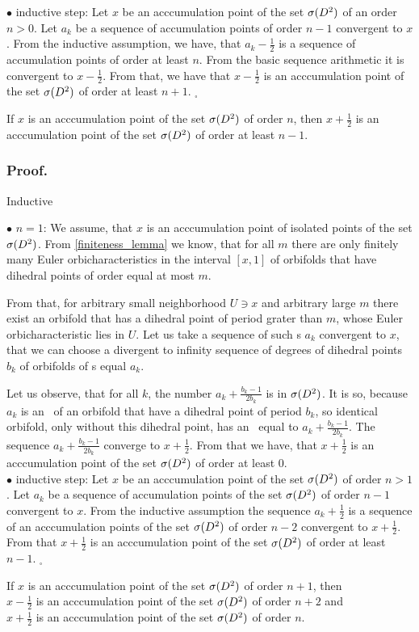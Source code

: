 $\bullet$ inductive step: Let $x$ be an acccumulation point of the set ${{\sigma}(D^2)}$ of an order 
$n > 0$. 
Let $a_k$ be a sequence of accumulation points of order $n-1$ convergent to $x$. From the 
inductive assumption, we have, that $a_k - \frac{1}{2}$ is a sequence of accumulation points 
of order at least $n$. From the basic sequence arithmetic it is convergent to $x-\frac{1}{2}$. 
From that, we have that $x-\frac{1}{2}$ is an acccumulation point of the set ${{\sigma}(D^2)}$ of order 
at least $n+1$. $_\square$
\begin{lemma}\label{second_order_lemma}
If $x$ is an acccumulation point of the set ${{\sigma}(D^2)}$ of order $n$, then $x+\frac{1}{2}$ is 
an acccumulation point of the set ${{\sigma}(D^2)}$ of order at least $n-1$.  
\end{lemma}
\subsubsection{Proof.}  
Inductive 

$\bullet$ $n = 1$: We assume, that $x$ is an acccumulation point of isolated points of the set 
${{\sigma}(D^2)}$. 
From \ref{finiteness_lemma} we know, that for all $m$ there are only finitely many 
Euler orbicharacteristics 
in the interval $[x,1]$ of orbifolds that have dihedral points of order equal at most $m$. 

From that, for arbitrary small neighborhood $U \ni x$ and arbitrary large $m$ there exist 
an orbifold 
that has a dihedral point of period grater than $m$, whose Euler orbicharacteristic lies in $U$. 
Let us take a sequence of such \Eoc s $a_k$ convergent to $x$, that we can choose 
a divergent to infinity sequence of degrees of dihedral points $b_k$ of orbifolds of \Eoc s 
equal $a_k$. 

Let us observe, that for all $k$, the number $a_k+\frac{b_k-1}{2b_k}$ is in ${{\sigma}(D^2)}$. 
It is so, because $a_k$ is an \Eoc\ of an orbifold that have a dihedral point of period $b_k$, so 
identical orbifold, only without this dihedral point, has an \Eoc\ equal to $a_k + 
\frac{b_k-1}{2b_k}$. 
The sequence $a_k + \frac{b_k-1}{2b_k}$ converge to $x+\frac{1}{2}$. From that we have, that 
$x + \frac{1}{2}$ is an acccumulation point of the set ${{\sigma}(D^2)}$ of order at least $0$. \\
$\bullet$ inductive step: Let $x$ be an acccumulation point of the set ${{\sigma}(D^2)}$ of order $n > 1$. 
Let $a_k$ be a sequence of accumulation points of the set ${{\sigma}(D^2)}$ of order $n-1$ 
convergent to $x$. 
From the inductive assumption the sequence $a_k + \frac{1}{2}$ is a sequence of an acccumulation
 points of the set ${{\sigma}(D^2)}$ of order $n-2$ convergent to $x + \frac{1}{2}$. From that 
 $x + \frac{1}{2}$ is an acccumulation point of the set ${{\sigma}(D^2)}$ of order at least 
 $n-1$. $_\square$ 
\begin{lemma}\label{third_order_lemma}
If $x$ is an acccumulation point of the set ${{\sigma}(D^2)}$ of order $n+1$, then \\
$x - \frac{1}{2}$ is an acccumulation point of the set ${{\sigma}(D^2)}$ of order $n+2$ and \\
$x + \frac{1}{2}$ is an acccumulation point of the set ${{\sigma}(D^2)}$ of order $n$. 
\end{lemma}
